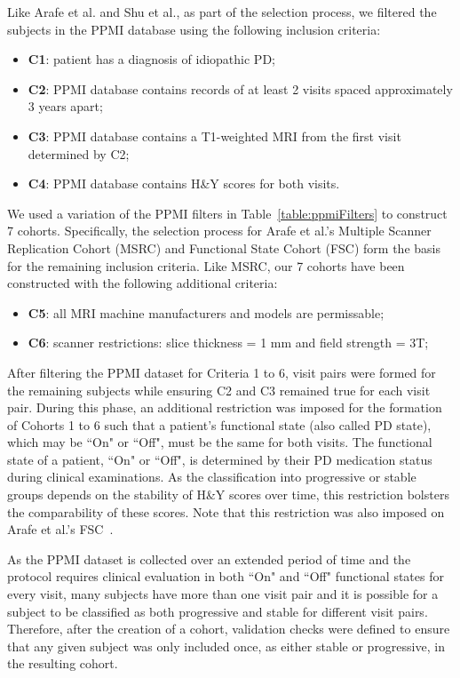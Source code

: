 Like Arafe et al. and Shu et al., as part of the selection process, we filtered the subjects in the PPMI database using the 
following inclusion criteria:
\begin{itemize}
  \item \textbf{C1}: patient has a diagnosis of idiopathic PD;
  \item \textbf{C2}: PPMI database contains records of at least 2 visits spaced approximately 3 years apart;
  \item \textbf{C3}: PPMI database contains a T1-weighted MRI from the first visit determined by C2;
  \item \textbf{C4}: PPMI database contains H\&Y scores for both visits. 
\end{itemize}

We used a variation of the PPMI filters in Table~\ref{table:ppmiFilters} to construct 7 cohorts. Specifically, the selection process for 
Arafe et al.'s Multiple Scanner Replication Cohort (MSRC) and Functional State Cohort (FSC) form the basis for the remaining inclusion 
criteria. Like MSRC, our 7 cohorts have been constructed with the following additional criteria:

\begin{itemize}
  \item \textbf{C5}: all MRI machine manufacturers and models are permissable;
  \item \textbf{C6}: scanner restrictions: slice thickness = 1 mm and field strength = 3T;
\end{itemize}

After filtering the PPMI dataset for Criteria 1 to 6, visit pairs were formed for the remaining subjects while ensuring C2 and C3 remained true for each visit pair. 
During this phase, an additional restriction was imposed for the formation of Cohorts 1 to 6 such that a patient's functional state (also called PD state), which 
may be ``On" or ``Off", must be the same for both visits. The functional state of a patient, ``On" or ``Off", is determined by their PD medication status during clinical 
examinations. As the classification into progressive or stable groups depends on the stability of H\&Y scores over time, this restriction bolsters the comparability of 
these scores. Note that this restriction was also imposed on Arafe et al.'s FSC~\cite{Arafe2023.05.05.539590}.

As the PPMI dataset is collected over an extended period of time and the protocol requires clinical evaluation in both ``On" and ``Off" functional states for every visit, many 
subjects have more than one visit pair and it is possible for a subject to be classified as both progressive and stable for different visit pairs. Therefore, after the 
creation of a cohort, validation checks were defined to ensure that any given subject was only included once, as either stable or progressive, in the resulting cohort. 

